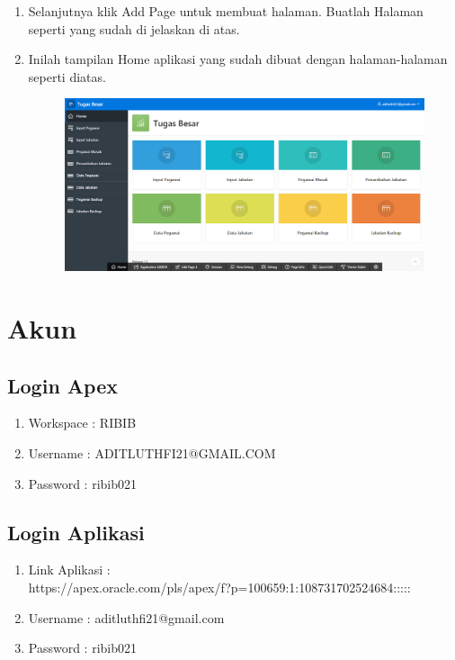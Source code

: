 \documentclass[12pt, times new roman, a4paper]{report}
\begin{document}
\begin{enumerate}
\item Selanjutnya klik Add Page untuk membuat halaman. Buatlah Halaman seperti yang sudah di jelaskan di atas.

\item Inilah tampilan Home aplikasi yang sudah dibuat dengan halaman-halaman seperti diatas.
\begin{figure}[h]
	\centering
		\includegraphics[scale=0.25]{gambar/30}
\end{figure} 
\end{enumerate}

\chapter{Akun}
\section{Login Apex}
\begin{enumerate}
\item Workspace : RIBIB
\item Username : ADITLUTHFI21@GMAIL.COM
\item Password : ribib021
\end{enumerate}

\section{Login Aplikasi}
\begin{enumerate}
\item Link Aplikasi :\\
https://apex.oracle.com/pls/apex/f?p=100659:1:108731702524684:::::
\item Username : aditluthfi21@gmail.com
\item Password : ribib021
\end{enumerate}
\end{document}

